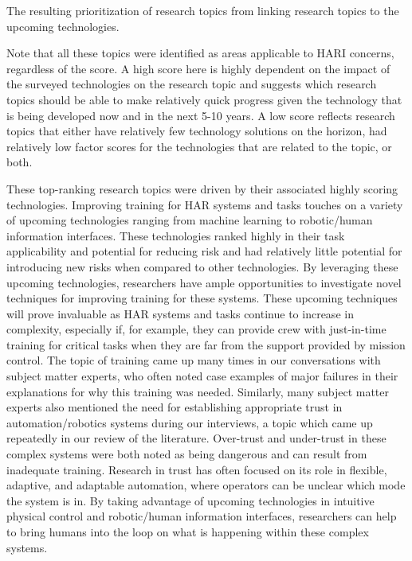 \begin{table}[tb]
    \centering
    \caption[Research topic prioritization]{The resulting prioritization of research topics from linking research topics to the upcoming technologies.}
    \label{table:topic-prioritization}
\end{table}

Note that all these topics were identified as areas applicable to HARI concerns, regardless of the score.
A high score here is highly dependent on the impact of the surveyed technologies on the research topic and suggests which research topics should be able to make relatively quick progress given the technology that is being developed now and in the next 5-10 years.
A low score reflects research topics that either have relatively few technology solutions on the horizon, had relatively low factor scores for the technologies that are related to the topic, or both.

These top-ranking research topics were driven by their associated highly scoring technologies.
Improving training for HAR systems and tasks touches on a variety of upcoming technologies ranging from machine learning to robotic/human information interfaces.
These technologies ranked highly in their task applicability and potential for reducing risk and had relatively little potential for introducing new risks when compared to other technologies.
By leveraging these upcoming technologies, researchers have ample opportunities to investigate novel techniques for improving training for these systems.
These upcoming techniques will prove invaluable as HAR systems and tasks continue to increase in complexity, especially if, for example, they can provide crew with just-in-time training for critical tasks when they are far from the support provided by mission control.
The topic of training came up many times in our conversations with subject matter experts, who often noted case examples of major failures in their explanations for why this training was needed.
Similarly, many subject matter experts also mentioned the need for establishing appropriate trust in automation/robotics systems during our interviews, a topic which came up repeatedly in our review of the literature.
Over-trust and under-trust in these complex systems were both noted as being dangerous and can result from inadequate training.
Research in trust has often focused on its role in flexible, adaptive, and adaptable automation, where operators can be unclear which mode the system is in.
By taking advantage of upcoming technologies in intuitive physical control and robotic/human information interfaces, researchers can help to bring humans into the loop on what is happening within these complex systems.


